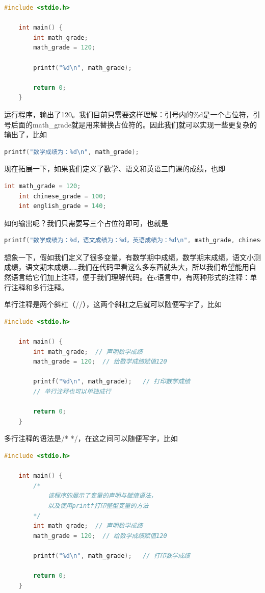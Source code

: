 \begin{lstlisting}[language=C]
    #include <stdio.h>

    int main() {
        int math_grade;
        math_grade = 120;

        printf("%d\n", math_grade); 

        return 0;
    }
\end{lstlisting}

运行程序，输出了120。我们目前只需要这样理解：引号内的\%d是一个占位符，引号后面的math\_grade就是用来替换占位符的。因此我们就可以实现一些更复杂的输出了，比如

\begin{lstlisting}[language=C]
    printf("数学成绩为：%d\n", math_grade); 
\end{lstlisting}

现在拓展一下，如果我们定义了数学、语文和英语三门课的成绩，也即

\begin{lstlisting}[language=C]
    int math_grade = 120;
    int chinese_grade = 100;
    int english_grade = 140;
\end{lstlisting}

如何输出呢？我们只需要写三个占位符即可，也就是

\begin{lstlisting}[language=C]
    printf("数学成绩为：%d，语文成绩为：%d，英语成绩为：%d\n", math_grade, chinese_grade, english_grade); 
\end{lstlisting}

想象一下，假如我们定义了很多变量，有数学期中成绩，数学期末成绩，语文小测成绩，语文期末成绩……我们在代码里看这么多东西就头大，所以我们希望能用自然语言给它们加上注释，便于我们理解代码。在c语言中，有两种形式的注释：单行注释和多行注释。

单行注释是两个斜杠（//），这两个斜杠之后就可以随便写字了，比如

\begin{lstlisting}[language=C]
    #include <stdio.h>

    int main() {
        int math_grade;  // 声明数学成绩
        math_grade = 120;  // 给数学成绩赋值120

        printf("%d\n", math_grade);   // 打印数学成绩
        // 单行注释也可以单独成行

        return 0;
    }
\end{lstlisting}

多行注释的语法是/* */，在这之间可以随便写字，比如

\begin{lstlisting}[language=C]
    #include <stdio.h>

    int main() {
        /*
            该程序的展示了变量的声明与赋值语法，
            以及使用printf打印整型变量的方法
        */
        int math_grade;  // 声明数学成绩
        math_grade = 120;  // 给数学成绩赋值120

        printf("%d\n", math_grade);   // 打印数学成绩

        return 0;
    }
\end{lstlisting}

